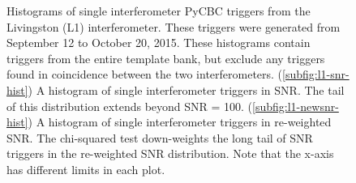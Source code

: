 \begin{figure}[!ht]%
\centering


  \caption[PyCBC SNR and re-weighted SNR histograms]{Histograms of single interferometer PyCBC %
           triggers from the Livingston (L1) interferometer. %
           These triggers were generated from September 12 to October 20, 2015. These histograms %
           contain triggers from the entire template bank, but %
           exclude any triggers found in coincidence between the two interferometers. %
           (\ref{subfig:l1-snr-hist}) A histogram of single interferometer triggers in SNR. %
           The tail of this distribution extends beyond SNR = 100. %
           (\ref{subfig:l1-newsnr-hist}) A histogram of single interferometer triggers in re-weighted SNR. %
           The chi-squared test down-weights the long tail of SNR triggers %
           in the re-weighted SNR distribution. Note that the x-axis has different %
           limits in each plot.}
  \label{fig:cbc-newsnr-histograms}
\end{figure}

